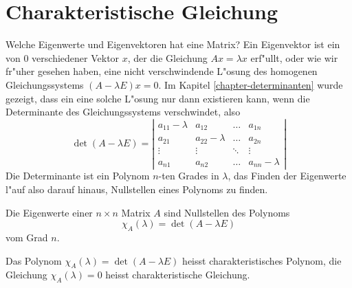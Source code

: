 \section{Charakteristische Gleichung}
Welche Eigenwerte und Eigenvektoren hat eine Matrix? Ein Eigenvektor 
ist ein von $0$ verschiedener Vektor $x$, der die Gleichung
$Ax=\lambda x$ erf"ullt, oder wie wir fr"uher gesehen haben,
eine nicht verschwindende L"osung des homogenen Gleichungssystems
$(A-\lambda E)x=0$.
Im Kapitel \ref{chapter-determinanten} wurde gezeigt, dass ein eine solche
L"osung nur dann existieren kann, wenn die Determinante des Gleichungssystems
verschwindet, also
\[
\det(A-\lambda E)=
\left|
\begin{matrix}
a_{11}-\lambda&a_{12}&\dots&a_{1n}\\
a_{21}&a_{22}-\lambda&\dots&a_{2n}\\
\vdots&\vdots&\ddots&\vdots\\
a_{n1}&a_{n2}&\dots&a_{nn}-\lambda
\end{matrix}
\right|
\]
Die Determinante ist ein Polynom $n$-ten Grades in $\lambda$, das Finden der
Eigenwerte l"auf also darauf hinaus, Nullstellen eines Polynoms zu finden.
\begin{satz}
Die Eigenwerte einer $n\times n$ Matrix $A$ sind Nullstellen des
Polynoms
\[
\chi_A(\lambda)=\det(A-\lambda E)
\]
vom Grad $n$.
\end{satz}
\begin{definition}
Das Polynom $\chi_A(\lambda)=\det(A-\lambda E)$ heisst
charakteristisches Polynom,
die Gleichung $\chi_A(\lambda)=0$ heisst 
charakteristische Gleichung.
\end{definition}


